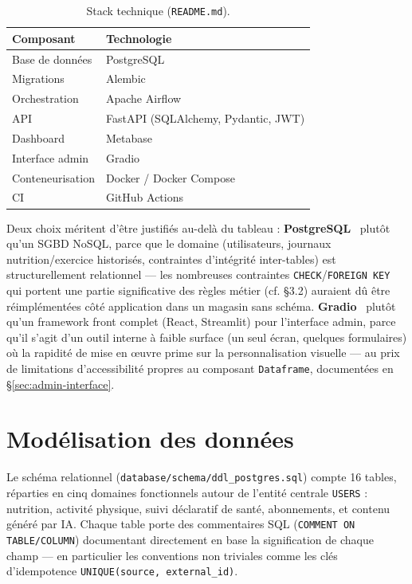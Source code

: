 \documentclass{article}
\begin{document}
\begin{table}[H]
\centering
\small
\begin{tabular}{@{}ll@{}}
\toprule
\textbf{Composant} & \textbf{Technologie} \\
\midrule
Base de données & PostgreSQL \\
Migrations & Alembic \\
Orchestration & Apache Airflow \\
API & FastAPI (SQLAlchemy, Pydantic, JWT) \\
Dashboard & Metabase \\
Interface admin & Gradio \\
Conteneurisation & Docker / Docker Compose \\
CI & GitHub Actions \\
\bottomrule
\end{tabular}
\caption{Stack technique (\texttt{README.md}).}
\end{table}

Deux choix méritent d'être justifiés au-delà du tableau : \textbf{PostgreSQL}~\citep{postgresql} plutôt qu'un SGBD NoSQL, parce que le domaine (utilisateurs, journaux nutrition/exercice historisés, contraintes d'intégrité inter-tables) est structurellement relationnel — les nombreuses contraintes \texttt{CHECK}/\texttt{FOREIGN KEY} qui portent une partie significative des règles métier (cf. \S3.2) auraient dû être réimplémentées côté application dans un magasin sans schéma. \textbf{Gradio}~\citep{gradio} plutôt qu'un framework front complet (React, Streamlit) pour l'interface admin, parce qu'il s'agit d'un outil interne à faible surface (un seul écran, quelques formulaires) où la rapidité de mise en œuvre prime sur la personnalisation visuelle — au prix de limitations d'accessibilité propres au composant \texttt{Dataframe}, documentées en \S\ref{sec:admin-interface}.

\section{Modélisation des données}

Le schéma relationnel (\texttt{database/schema/ddl\_postgres.sql}) compte 16 tables, réparties en cinq domaines fonctionnels autour de l'entité centrale \texttt{USERS} : nutrition, activité physique, suivi déclaratif de santé, abonnements, et contenu généré par IA. Chaque table porte des commentaires SQL (\texttt{COMMENT ON TABLE/COLUMN}) documentant directement en base la signification de chaque champ — en particulier les conventions non triviales comme les clés d'idempotence \texttt{UNIQUE(source, external\_id)}.
\end{document}
